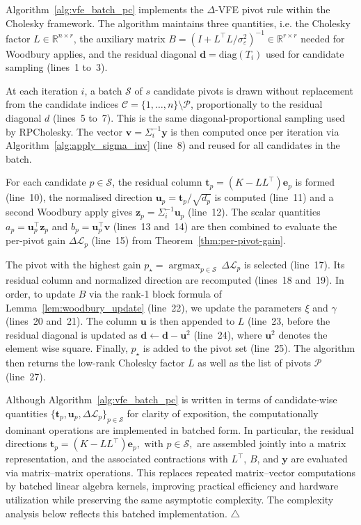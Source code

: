 \documentclass[onefignum,onetabnum]{siamart250211}
\DeclareMathOperator*{\argmax}{argmax}
\begin{document}
Algorithm~\ref{alg:vfe_batch_pc} implements the $\Delta$-VFE pivot rule within the Cholesky framework. The algorithm maintains three quantities, i.e. the Cholesky factor $L \in \mathbb{R}^{n \times r}$, the auxiliary matrix $B = (I + L^\top L/\sigma_\varepsilon^{2})^{-1} \in\mathbb{R}^{r \times r}$ needed for Woodbury applies, and the residual diagonal $\bm{d} = \mathrm{diag}(T_i)$ used for candidate sampling (lines~1 to~3).

At each iteration $i$, a batch $\mathcal{S}$ of $s$ candidate pivots is drawn without replacement from the candidate indices $\mathcal{C} = \{1,\ldots,n\} \setminus \mathcal{P}$, proportionally to the residual diagonal $d$ (lines~5 to~7). This is the same diagonal-proportional sampling used by RPCholesky. The vector $\bm{v} = \Sigma_i^{-1}\bm{y}$ is then computed once per iteration via Algorithm~\ref{alg:apply_sigma_inv} (line~8) and reused for all candidates in the batch.

For each candidate $p \in \mathcal{S}$, the residual column $\bm{t}_p = (K - LL^\top)\bm{e}_p$ is formed (line~10), the normalised direction $\bm{u}_p = \bm{t}_p/\sqrt{d_p}$ is computed (line~11) and a second Woodbury apply gives $\bm{z}_p = \Sigma_i^{-1} \bm{u}_p$ (line~12). The scalar quantities $a_p = \bm{u}_p^\top\bm{z}_p$ and $b_p = \bm{u}_p^\top\bm{v}$ (lines~13 and~14) are then combined to evaluate the per-pivot gain $\Delta\mathcal{L}_p$ (line~15) from Theorem~\ref{thm:per-pivot-gain}.

The pivot with the highest gain $p_\star = \argmax_{p \in \mathcal{S}}\,\Delta\mathcal{L}_p$ is selected (line~17). Its residual column and normalized direction are recomputed (lines~18 and~19). 
In order, to update $B$ via the rank-1 block formula of Lemma~\ref{lem:woodbury_update} (line~22), we update the parameters $\xi$ and $\gamma$ (lines~20 and~21).
The column $\bm{u}$ is then appended to $L$ (line~23, before the residual diagonal is updated as $\bm{d} \leftarrow \bm{d} - \bm{u}^2$ (line~24), where $\bm{u}^2$ denotes the element wise square. Finally, $p_\star$ is added to the pivot set (line~25).
The algorithm then returns the low-rank Cholesky factor $L$ as well as the list of pivots $\mathcal{P}$ (line~27).

\begin{remark}
Although Algorithm~\ref{alg:vfe_batch_pc} is written in terms of candidate-wise quantities $\{\bm t_p,\bm u_p,\Delta\mathcal L_p\}_{p\in\mathcal S}$ for clarity of exposition, the computationally dominant operations are implemented in batched form. In particular, the residual directions $\bm t_p=(K-LL^\top)\bm e_p, \text{~with~} p\in\mathcal S,$ are assembled jointly into a matrix representation, and the associated contractions with $L^\top$, $B$, and $\bm y$ are evaluated via matrix--matrix operations. This replaces repeated matrix--vector computations by batched linear algebra kernels, improving practical efficiency and hardware utilization while preserving the same asymptotic complexity. The complexity analysis below reflects this batched implementation.
\hfill $\triangle$
\end{remark}
\end{document}
